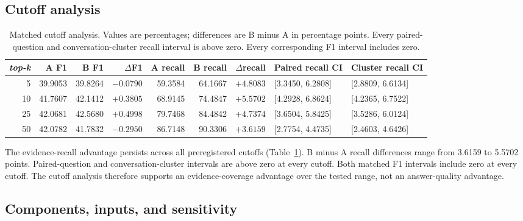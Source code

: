 \documentclass[10pt,twocolumn]{article}
\newcommand{\topk}{\textit{top-k}}
\begin{document}
\subsection{Cutoff analysis}

\begin{table}[t]
\centering
\caption{Matched cutoff analysis. Values are percentages; differences are
B minus A in percentage points. Every paired-question and
conversation-cluster recall interval is above zero. Every corresponding F1
interval includes zero.}
\label{tab:cutoffs}
\begin{tabular}{@{}rrrrrrrll@{}}
\toprule
\topk{} & A F1 & B F1 & \(\Delta\)F1 & A recall & B recall &
\(\Delta\)recall & Paired recall CI & Cluster recall CI \\
\midrule
5  & 39.9053 & 39.8264 & \(-0.0790\) & 59.3584 & 64.1667 & \(+4.8083\) & [3.3450, 6.2808] & [2.8809, 6.6134] \\
10 & 41.7607 & 42.1412 & \(+0.3805\) & 68.9145 & 74.4847 & \(+5.5702\) & [4.2928, 6.8624] & [4.2365, 6.7522] \\
25 & 42.0681 & 42.5680 & \(+0.4998\) & 79.7468 & 84.4842 & \(+4.7374\) & [3.6504, 5.8425] & [3.5286, 6.0124] \\
50 & 42.0782 & 41.7832 & \(-0.2950\) & 86.7148 & 90.3306 & \(+3.6159\) & [2.7754, 4.4735] & [2.4603, 4.6426] \\
\bottomrule
\end{tabular}
\end{table}

The evidence-recall advantage persists across all preregistered cutoffs
(Table~\ref{tab:cutoffs}). B minus A recall differences range from 3.6159 to
5.5702 points. Paired-question and conversation-cluster intervals are above
zero at every cutoff. Both matched F1 intervals include zero at every cutoff.
The cutoff analysis therefore supports an evidence-coverage advantage over the
tested range, not an answer-quality advantage.

\subsection{Components, inputs, and sensitivity}
\end{document}
